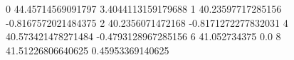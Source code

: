0 44.45714569091797 3.4044113159179688
1 40.23597717285156 -0.8167572021484375
2 40.2356071472168 -0.8171272277832031
4 40.573421478271484 -0.4793128967285156
6 41.052734375 0.0
8 41.51226806640625 0.45953369140625
